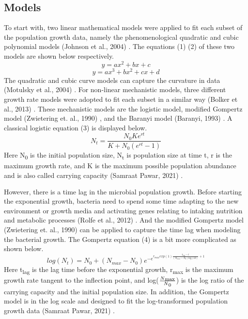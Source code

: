 \documentclass[11pt, a4paper]{article}
\begin{document}
\subsection{Models}
To start with, two linear mathematical models were applied to fit each subset of the population growth data, namely the phenomenological quadratic and cubic polynomial models (Johnson et al., 2004) \cite{johnson2004model}. The equations (1) (2) of these two models are shown below respectively. 
\begin{equation}
y = ax^2 + bx + c
\end{equation}
\begin{equation}
y = ax^3 + bx^2 + cx + d
\end{equation}
The quadratic and cubic curve models can capture the curvature in data (Motulsky et al., 2004) \cite{motulsky2004fitting}. For non-linear mechanistic models, three different growth rate models were adopted to fit each subset in a similar way (Bolker et al., 2013) \cite{bolker2013strategies} . These mechanistic models are the logistic model, modified Gompertz model (Zwietering et. al., 1990) \cite{zwietering1990modeling}, and the Baranyi model (Baranyi, 1993) \cite{baranyi1993non}. A classical logistic equation (3) is displayed below. 
\begin{equation}
N_t = \frac{N_0Ke^{rt}}{K + N_0(e^{rt} - 1)}
\end{equation}
Here N\textsubscript{0} is the initial population size, N\textsubscript{t} is population size at time t, r is the maximum growth rate, and K is the maximum possible population abundance and is also called carrying capacity (Samraat Pawar, 2021) \cite{pawar}.  

However, there is a time lag in the microbial population growth. Before starting the exponential growth, bacteria need to spend some time adapting to the new environment or growth media and activating genes relating to intaking nutrition and metabolic processes (Rolfe et al., 2012) \cite{rolfe2012lag}. And the modified Gompertz model (Zwietering et. al., 1990) \cite{zwietering1990modeling} can be applied to capture the time lag when modeling the bacterial growth. The Gompertz equation (4) is a bit more complicated as shown below. 
\begin{equation}
log(N_t) = N_0 + (N_{max} - N_0)e^{-e^{r_{max}exp(1)\frac{t_{lag}-t}{(N_{max}-N_0)log(10)}+1}}
\end{equation}
Here t\textsubscript{lag} is the lag time before the exponential growth, r\textsubscript{max} is the maximum growth rate tangent to the inflection point, and log($\frac{N\textsubscript{max}}{N\textsubscript{0}}$) is the log ratio of the carrying capacity and the initial population size. In addition, the Gompertz model is in the log scale and designed to fit the log-transformed population growth data (Samraat Pawar, 2021) \cite{pawar}. 
\end{document}
